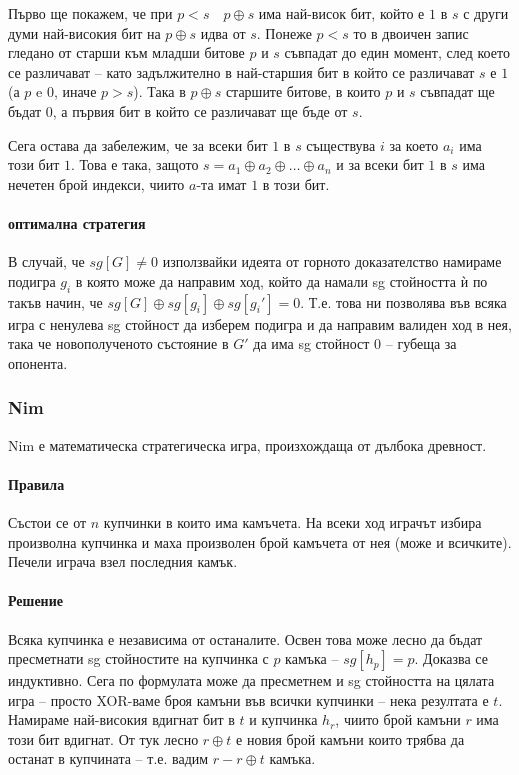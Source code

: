 \documentclass[a4paper]{article}
\begin{document}
    Първо ще покажем, че при $p < s \quad p \oplus s$ има най-висок бит, който
    е $1$ в $s$ с други думи най-високия бит на $p \oplus s$ идва от $s$.
    Понеже $p < s$ то в двоичен запис гледано от старши към младши битове $p$
    и $s$ съвпадат до един момент, след което се различават -- като
    задължително в най-старшия бит в който се различават $s$ е $1$ (а $p$
    e $0$, иначе $p > s$). Така в $p \oplus s$ старшите битове, в които $p$
    и $s$ съвпадат ще бъдат $0$, а първия бит в който се различават ще бъде от
    $s$.

    Сега остава да забележим, че за всеки бит $1$ в $s$ съществува $i$ за което
    $a_i$ има този бит $1$. Това е така, защото $s = a_1 \oplus a_2 \oplus
    \dots \oplus a_n$ и за всеки бит $1$ в $s$ има нечетен брой индекси, чиито
    $a$-та имат $1$ в този бит.

    \paragraph{оптимална стратегия}
    В случай, че $sg[G] \ne 0$ използвайки идеята от горното доказателство
    намираме подигра $g_i$ в която може да направим ход, който да намали sg
    стойността ѝ по такъв начин, че $sg[G] \oplus sg[g_i] \oplus sg[g_i'] = 0$.
    Т.е. това ни позволява във всяка игра с ненулева sg стойност да изберем
    подигра и да направим валиден ход в нея, така че новополученото състояние
    в $G'$ да има sg стойност $0$ -- губеща за опонента.

    \subsubsection{Nim}
    Nim е математическа стратегическа игра, произхождаща от дълбока древност.
    \paragraph{Правила}
    Състои се от $n$ купчинки в които има камъчета. На всеки ход играчът избира
    произволна купчинка и маха произволен брой камъчета от нея (може
    и всичките). Печели играча взел последния камък.
    
    \paragraph{Решение}
    Всяка купчинка е независима от останалите. Освен това може лесно да бъдат
    пресметнати sg стойностите на купчинка с $p$ камъка -- $sg[h_p] = p$.
    Доказва се индуктивно. Сега по формулата може да пресметнем и sg стойността
    на цялата игра -- просто XOR-ваме броя камъни във всички купчинки -- нека
    резултата е $t$. Намираме най-високия вдигнат бит в $t$ и купчинка $h_r$,
    чиито брой камъни $r$ има този бит вдигнат. От тук лесно $r \oplus t$
    е новия брой камъни които трябва да останат в купчината -- т.е. вадим $r
    - r \oplus t$ камъка.
\end{document}
